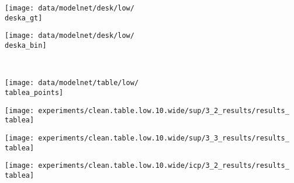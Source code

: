 {\begin{minipage}[t]{0.10\textwidth}
	\vspace{0px}\centering
	\texttt{[image: data/modelnet/desk/low/\\deska\_gt]}
\end{minipage}
\begin{minipage}[t]{0.10\textwidth}
	\vspace{0px}\centering
	\texttt{[image: data/modelnet/desk/low/\\deska\_bin]}
\end{minipage}
\\[-2px]
\hspace*{-6px}
\begin{minipage}[t]{0.02\textwidth}
    \vspace{0px}\centering
    \vspace{2.5mm}
\end{minipage}
\begin{minipage}[t]{0.10\textwidth}
	\vspace{0px}\centering
	\texttt{[image: data/modelnet/table/low/\\tablea\_points]}
\end{minipage}
\begin{minipage}[t]{0.10\textwidth}
	\vspace{0px}\centering
	\texttt{[image: experiments/clean.table.low.10.wide/sup/3\_2\_results/results\_\\tablea]}
\end{minipage}
\begin{minipage}[t]{0.10\textwidth}
	\vspace{0px}\centering
	\texttt{[image: experiments/clean.table.low.10.wide/sup/3\_3\_results/results\_\\tablea]}
\end{minipage}
\begin{minipage}[t]{0.10\textwidth}
	\vspace{0px}\centering
	\texttt{[image: experiments/clean.table.low.10.wide/icp/3\_2\_results/results\_\\tablea]}

\end{minipage}}
